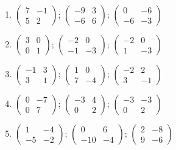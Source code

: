 \begin{enumerate}[label=\arabic*., leftmargin=*, itemsep=1pt]
\item $\left(\begin{smallmatrix}7 & -1\\ 5 & 2\end{smallmatrix}\right)$; $\left(\begin{smallmatrix}-9 & 3\\ -6 & 6\end{smallmatrix}\right)$; $\left(\begin{smallmatrix}0 & -6\\ -6 & -3\end{smallmatrix}\right)$
\item $\left(\begin{smallmatrix}3 & 0\\ 0 & 1\end{smallmatrix}\right)$; $\left(\begin{smallmatrix}-2 & 0\\ -1 & -3\end{smallmatrix}\right)$; $\left(\begin{smallmatrix}-2 & 0\\ 1 & -3\end{smallmatrix}\right)$
\item $\left(\begin{smallmatrix}-1 & 3\\ 3 & 1\end{smallmatrix}\right)$; $\left(\begin{smallmatrix}1 & 0\\ 7 & -4\end{smallmatrix}\right)$; $\left(\begin{smallmatrix}-2 & 2\\ 3 & -1\end{smallmatrix}\right)$
\item $\left(\begin{smallmatrix}0 & -7\\ 0 & 7\end{smallmatrix}\right)$; $\left(\begin{smallmatrix}-3 & 4\\ 0 & 2\end{smallmatrix}\right)$; $\left(\begin{smallmatrix}-3 & -3\\ 0 & 2\end{smallmatrix}\right)$
\item $\left(\begin{smallmatrix}1 & -4\\ -5 & -2\end{smallmatrix}\right)$; $\left(\begin{smallmatrix}0 & 6\\ -10 & -4\end{smallmatrix}\right)$; $\left(\begin{smallmatrix}2 & -8\\ 9 & -6\end{smallmatrix}\right)$

\end{enumerate}
